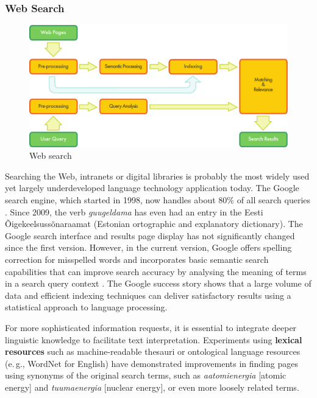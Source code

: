 \begin{multicols}{2}
\subsubsection{Web Search}

\begin{figure}[htb]
  \center
  \includegraphics[width=\textwidth]{../_media/english/web_search_architecture}
  \caption{Web search}
\label{fig:websearcharch_en}
 \end{figure}

Searching the Web, intranets or digital libraries is probably the most widely used yet largely underdeveloped language technology application today. The Google search engine, which started in 1998, now handles about 80\% of all search queries \cite{spi1}. Since 2009, the verb \textit{guugeldama} has even had an entry in the Eesti Õigekeelsussõnaraamat (Estonian ortographic and explanatory dictionary). The Google search interface and results page display has not significantly changed since the first version. However, in the current version, Google offers spelling correction for misspelled words and incorporates basic semantic search capabilities that can improve search accuracy by analysing the meaning of terms in a search query context \cite{pc1}. The Google success story shows that a large volume of data and efficient indexing techniques can deliver satisfactory results using a statistical approach to language processing. 

For more sophisticated information requests, it is essential to integrate deeper linguistic knowledge to facilitate text interpretation. Experiments using \textbf{lexical resources} such as machine-readable thesauri or ontological language resources (e.\,g., WordNet for English) have demonstrated improvements in finding pages using synonyms of the original search terms, such as \textit{aatomienergia} {[}atomic energy{]} and \textit{tuumaenergia} {[}nuclear energy{]}, or even more loosely related terms.


\end{multicols}
